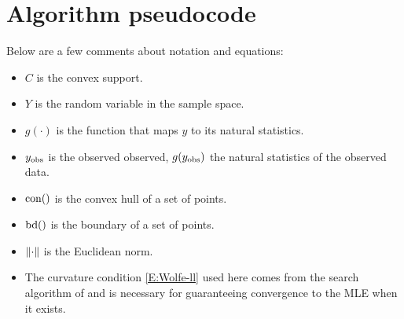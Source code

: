 \section{Algorithm pseudocode}
Below are a few comments about notation and equations:
\begin{itemize}
\item $C$ is the convex support.
\item $Y$ is the random variable in the sample space.
\item $g(\cdot)$ is the function that maps $y$ to its natural statistics.
\item $y_{\text{obs}}$ is the observed observed, $g(y_{\text{obs}})$ the natural statistics of the observed data.
\item $\operatorname{con}()$ is the convex hull of a set of points.
\item $\operatorname{bd}()$ is the boundary of a set of points.
\item $\lVert \cdot \rVert$ is the Euclidean norm.
\item The curvature condition \eqref{E:Wolfe-ll} used here comes from the search 
algorithm of \citet{Okabayashi:longrange} and is necessary for guaranteeing 
convergence to the MLE when it exists.
\end{itemize}

